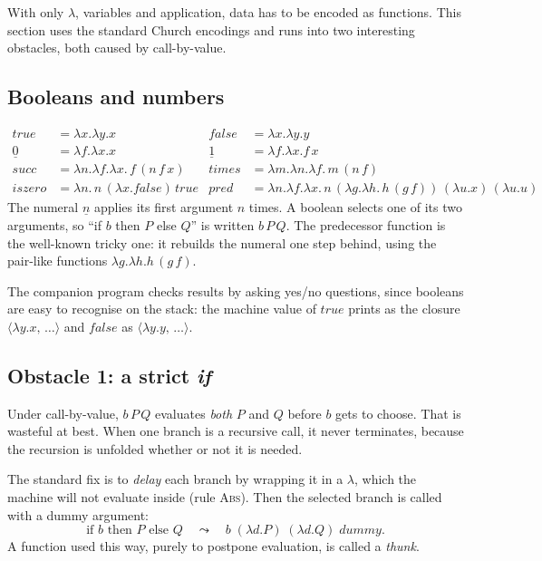\documentclass[11pt,a4paper]{article}
\newcommand{\cl}[2]{\langle #1,\, #2\rangle}
\newcommand{\rul}[1]{\textsc{#1}}
\theoremstyle{definition}
\theoremstyle{plain}
\begin{document}
With only $\lambda$, variables and application, data has to be encoded as
functions. This section uses the standard Church encodings and runs into two
interesting obstacles, both caused by call-by-value.

\subsection{Booleans and numbers}

\begin{align*}
  \mathit{true} &= \lambda x.\lambda y.x &
  \mathit{false} &= \lambda x.\lambda y.y\\
  \underline{0} &= \lambda f.\lambda x.x &
  \underline{1} &= \lambda f.\lambda x.f\,x\\
  \mathit{succ} &= \lambda n.\lambda f.\lambda x.\,f\,(n\,f\,x) &
  \mathit{times} &= \lambda m.\lambda n.\lambda f.\,m\,(n\,f)\\
  \mathit{iszero} &= \lambda n.\,n\,(\lambda x.\mathit{false})\,\mathit{true} &
  \mathit{pred} &= \lambda n.\lambda f.\lambda x.\,n\,(\lambda g.\lambda h.\,h\,(g\,f))\,(\lambda u.x)\,(\lambda u.u)
\end{align*}
The numeral $\underline{n}$ applies its first argument $n$ times. A boolean
selects one of its two arguments, so ``if $b$ then $P$ else $Q$'' is
written $b\,P\,Q$. The predecessor function is the well-known tricky one: it
rebuilds the numeral one step behind, using the pair-like functions
$\lambda g.\lambda h.h\,(g\,f)$.

The companion program checks results by asking yes/no questions, since
booleans are easy to recognise on the stack: the machine value of
$\mathit{true}$ prints as the closure $\cl{\lambda y.x}{\dots}$ and
$\mathit{false}$ as $\cl{\lambda y.y}{\dots}$.

\subsection{Obstacle 1: a strict \emph{if}}

Under call-by-value, $b\,P\,Q$ evaluates \emph{both} $P$ and $Q$ before $b$
gets to choose. That is wasteful at best. When one branch is a recursive
call, it never terminates, because the recursion is unfolded whether or not
it is needed.

The standard fix is to \emph{delay} each branch by wrapping it in a
$\lambda$, which the machine will not evaluate inside (rule \rul{Abs}). Then
the selected branch is called with a dummy argument:
\[
  \text{if } b \text{ then } P \text{ else } Q
  \quad\leadsto\quad
  b\;(\lambda d.P)\;(\lambda d.Q)\;\mathit{dummy}.
\]
A function used this way, purely to postpone evaluation, is called a
\emph{thunk}.
\end{document}
